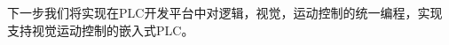 \documentclass[journal,UTF8]{IEEEtran}
\begin{document}
下一步我们将实现在PLC开发平台中对逻辑，视觉，运动控制的统一编程，实现支持视觉运动控制的嵌入式PLC。

\ifCLASSOPTIONcaptionsoff
  \newpage
\fi





%
%
%




%
\end{document}
